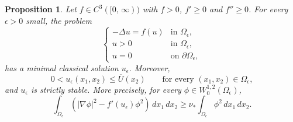 \documentclass[reqno,12pt]{amsart}
\numberwithin{equation}{section}
\newtheorem{proposition}[theorem]{Proposition}
\theoremstyle{remark}
\begin{document}
\begin{proposition} \label{prop:minimal-stability}
Let $f\in C^3([0,\,\infty))$ with $f>0$, $f'\ge 0$ and $f''\ge 0$.  For every $\epsilon>0$ small, the problem
$$
\begin{cases}
-\Delta u=f(u) & \text{in }\Omega_\epsilon, \\
u>0 & \text{in }\Omega_\epsilon, \\
u=0 & \text{on }\partial\Omega_\epsilon,
\end{cases}
$$
has a minimal classical solution $u_\epsilon$. Moreover,
$$
0<u_\epsilon(x_1,x_2)\le \overline U(x_2)
\qquad\text{for every }(x_1,x_2)\in\Omega_\epsilon,
$$
and $u_\epsilon$ is strictly stable.  More precisely, for every
$\phi\in W_0^{1,2}(\Omega_\epsilon)$,
\begin{equation}\label{eq:strict-stability}
\int_{\Omega_\epsilon}
\left(|\nabla \phi|^2-f'(u_\epsilon)\phi^2\right)\,dx_1\,dx_2
\ge \nu_*\int_{\Omega_\epsilon}\phi^2\,dx_1\,dx_2.
\end{equation}
\end{proposition}
\end{document}
